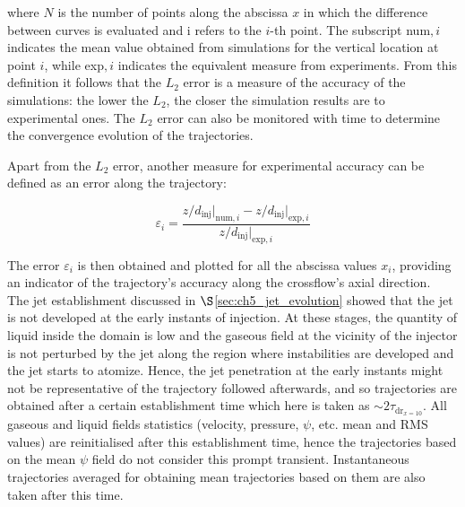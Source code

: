 where $N$ is the number of points along the abscissa $x$ in which the difference between curves is evaluated and i refers to the $i$-th point. The subscript num$,i$ indicates the mean value obtained from simulations for the vertical location at point $i$, while exp$,i$ indicates the equivalent measure from experiments. From this definition it follows that the $L_2$ error is a measure of the accuracy of the simulations: the lower the $L_2$, the closer the simulation results are to experimental ones. The $L_2$ error can also be monitored with time to determine the convergence evolution of the trajectories.

Apart from the $L_2$ error, another measure for experimental accuracy can be defined as an error along the trajectory:



\begin{equation}
\label{eq:error_along_trajectory}
\varepsilon_i  =  \frac{ z/d_\mathrm{inj} \Bigr|_{\mathrm{num},i} - z/d_\mathrm{inj} \Bigr|_{\mathrm{exp},i} }{ z/d_\mathrm{inj} \Bigr|_{\mathrm{exp},i} }
\end{equation}

The error $\varepsilon_i$ is then obtained and plotted for all the abscissa values $x_i$, providing an indicator of the trajectory’s accuracy along the crossflow’s axial direction. \\


The jet establishment discussed in $\S$\ref{sec:ch5_jet_evolution} showed that the jet is not developed at the early instants of injection. At these stages, the quantity of liquid inside the domain is low and the gaseous field at the vicinity of the injector is not perturbed by the jet along the region where instabilities are developed and the jet starts to atomize. Hence, the jet penetration at the early instants might not be representative of the trajectory followed afterwards, and so trajectories are obtained after a certain establishment time which here is taken as $\sim 2 \tau_{\mathrm{dr}_{x=10}}$. All gaseous and liquid fields statistics (velocity, pressure, $\psi$, etc. mean and RMS values) are reinitialised after this establishment time, hence the trajectories based on the mean $\psi$ field do not consider this prompt transient. Instantaneous trajectories averaged for obtaining mean trajectories based on them are also taken after this time.


